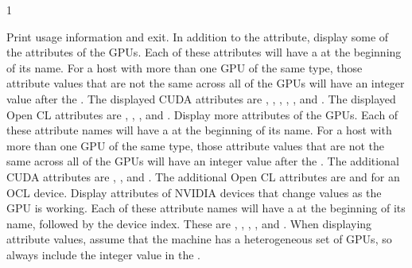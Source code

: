 \begin{ManPage}{\label{man-condor-gpu-discovery}}{1}
\begin{Options}
   {
    Print usage information and exit.
  }
   {
    In addition to the  attribute, display
    some of the attributes of the GPUs.
    Each of these attributes will have a 
    at the beginning of its name.
    For a host with more than one GPU of the same type,
    those attribute values that are not the same across all of the GPUs
    will have an integer value after the .
    The displayed CUDA attributes are
    , , ,
    , , and .
    The displayed Open CL attributes are
    , , , and
    .
  }
   {
    Display more attributes of the GPUs.
    Each of these attribute names will have a 
    at the beginning of its name.
    For a host with more than one GPU of the same type,
    those attribute values that are not the same across all of the GPUs
    will have an integer value after the .
    The additional CUDA attributes are
    , , and .
    The additional Open CL attributes are
     and  for an OCL device.
  }
   {
    Display attributes of NVIDIA devices that change values as the GPU
    is working.
    Each of these attribute names will have a 
    at the beginning of its name, followed by the device index.
    These are , , ,
    , and .
  }
   {
    When displaying attribute values, assume that the machine has a
    heterogeneous set of GPUs,
    so always include the integer value in the .
  }
\end{Options}
\end{ManPage}
